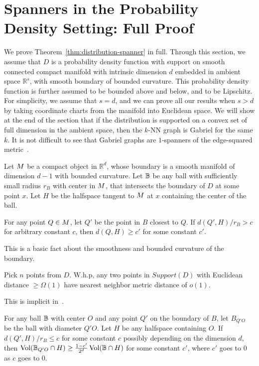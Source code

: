 \section{Spanners in the Probability Density Setting: Full
  Proof}\label{ap:distribution-spanner}

We prove Theorem~\ref{thm:distribution-spanner} in full.
Through this section, we assume that $D$ is a probability density
function with support on smooth connected compact manifold with intrinsic dimension
$d$ embedded in ambient space $\mathbb{R}^s$, 
with smooth boundary of bounded curvature. This
probability density function is further assumed to be bounded
above and below, and to be Lipschitz. For simplicity, we assume that
$s=d$, and we can prove all our results when $s > d$ by taking
coordinate charts from the manifold into Euclidean space.  We
will show at the end of the section that if the distribution is
supported on a convex set of full dimension in the ambient space,
then the $k$-NN graph is Gabriel for the same $k$. It is not
difficult to see that Gabriel graphs are $1$-spanners of the
edge-squared metric~\cite{SridharMaster}.

\begin{lemma}
  Let $M$ be a compact object in $\mathbb{R}^d$, whose
  boundary is a smooth manifold of dimension $d-1$ with bounded
  curvature.
  Let $\mathbb{B}$ be any ball with sufficiently small radius
  $r_B$ with center in $M$, that intersects the boundary of $D$
  at some point $x$.
  Let $H$ be the halfspace tangent to $M$ at $x$ containing the center
  of the ball.

For any point $Q \in M$, let $Q'$ be the point in $B$
closest to $Q$. If $d(Q', H) / r_B > c$ for arbitrary constant $c$,
then $d(Q, H) \geq c'$ for some constant $c'$.
\end{lemma}

This is a basic fact about the smoothness and bounded curvature
of the boundary.

\begin{lemma} Pick $n$ points from $D$. W.h.p, any two points in
  $Support(D)$ with Euclidean distance $ \geq \Omega(1)$ 
  have nearest neighbor metric distance of $o(1)$.
\end{lemma}

This is implicit in~\cite{hwang2016}.
\begin{lemma} For any ball $\mathbb{B}$ with center $O$ and any point $Q'$ on the
  boundary of $B$, let $B_{Q'O}$ be the ball with diameter $Q'O$.
  Let $H$ be any halfspace containing $O$.
  If $d(Q', H) / r_B \leq c$ for some constant
  $c$ possibly depending on the dimension $d$, then
  $\operatorname{Vol}(\mathbb{B}_{Q'O} \cap H) \geq \frac{1-c'}{2^d} \operatorname{Vol}(\mathbb{B} \cap H)$
  for some
  constant $c'$, where $c'$ goes to $0$ as $c$ goes to $0$.
\end{lemma}


